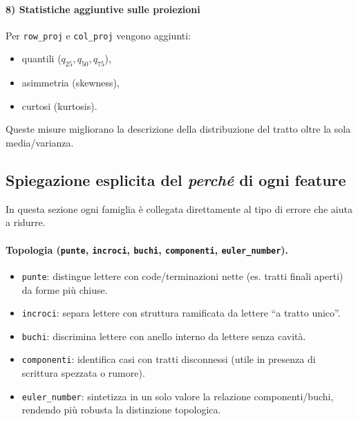 \documentclass[a4paper,12pt]{article}
\begin{document}
\paragraph{8) Statistiche aggiuntive sulle proiezioni}
Per \texttt{row\_proj} e \texttt{col\_proj} vengono aggiunti:
\begin{itemize}[leftmargin=1.5em]
  \item quantili ($q_{25}, q_{50}, q_{75}$),
  \item asimmetria (skewness),
  \item curtosi (kurtosis).
\end{itemize}
Queste misure migliorano la descrizione della distribuzione del tratto oltre la sola media/varianza.

\subsection{Spiegazione esplicita del \textit{perché} di ogni feature}
In questa sezione ogni famiglia è collegata direttamente al tipo di errore che aiuta a ridurre.

\paragraph{Topologia (\texttt{punte}, \texttt{incroci}, \texttt{buchi}, \texttt{componenti}, \texttt{euler\_number}).}
\begin{itemize}[leftmargin=1.5em]
  \item \texttt{punte}: distingue lettere con code/terminazioni nette (es. tratti finali aperti) da forme più chiuse.
  \item \texttt{incroci}: separa lettere con struttura ramificata da lettere ``a tratto unico''.
  \item \texttt{buchi}: discrimina lettere con anello interno da lettere senza cavità.
  \item \texttt{componenti}: identifica casi con tratti disconnessi (utile in presenza di scrittura spezzata o rumore).
  \item \texttt{euler\_number}: sintetizza in un solo valore la relazione componenti/buchi, rendendo più robusta la distinzione topologica.
\end{itemize}
\end{document}
